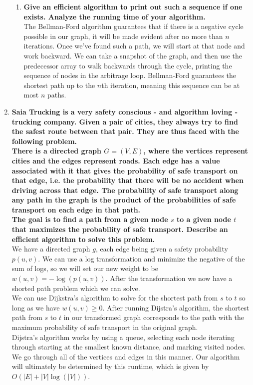 \documentclass{article}
\begin{document}
\begin{enumerate}
\begin{enumerate}
\item \textbf{ Give an efficient algorithm to print out such a sequence if one exists. Analyze the running time of your algorithm. } \\

The Bellman-Ford algorithm guarantees that if there is a negative cycle possible in our graph, it will be made evident after no more than $n$ iterations. Once we've found such a path, we will start at that node and work backward. We can take a snapshot of the graph, and then use the predecessor array to walk backwards through the cycle, printing the sequence of nodes in the arbitrage loop. Bellman-Ford guarantees the shortest path up to the $n$th iteration, meaning this sequence can be at most $n$ paths.



\end{enumerate}






\newpage
\item \textbf{ Saia Trucking is a very safety conscious - and algorithm loving - trucking company. Given a pair of cities, they always try to find the safest route between that pair. They are thus faced with the following problem. } \\
\textbf{ There is a directed graph $G=(V,E)$, where the vertices represent cities and the edges represent roads. Each edge has a value associated with it that gives the probability of safe transport on that edge, i.e. the probability that there will be no accident when driving across that edge. The probability of safe transport along any path in the graph is the product of the probabilities of safe transport on each edge in that path. } \\
\textbf{ The goal is to find a path from a given node $s$ to a given node $t$ that maximizes the probability of safe transport. Describe an efficient algorithm to solve this problem. } \\

We have a directed graph $g$, each edge being given a safety probability $p(u,v)$. We can use a log transformation and minimize the negative of the sum of logs, so we will set our new weight to be $w(u,v) = - \log(p(u,v))$. After the transformation we now have a shorted path problem which we can solve. \\
\newline 
We can use Dijkstra's algorithm to solve for the shortest path from $s$ to $t$ so long as we have $w(u,v) \geq 0$. After running Dijstra's algorithm, the shortest path from $s$ to $t$ in our transformed graph corresponds to the path with the maximum probability of safe transport in the original graph. \\
\newline 
Dijstra's algorithm works by using a queue, selecting each node iterating through starting at the smallest known distance, and marking visited nodes. We go through all of the vertices and edges in this manner. Our algorithm will ultimately be determined by this runtime, which is given by $O(|E| + |V| \log (|V|))$.

\end{enumerate}
\end{document}
